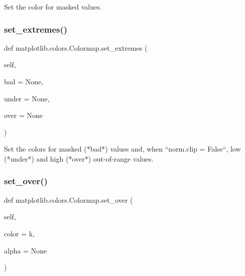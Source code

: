 \begin{DoxyVerb}Set the color for masked values.\end{DoxyVerb}
 \mbox{\label{classmatplotlib_1_1colors_1_1Colormap_a9038b3b8d92f01f8d33e3a053a60f606}} 
\subsubsection{\texorpdfstring{set\+\_\+extremes()}{set\_extremes()}}
{\footnotesize\ttfamily def matplotlib.\+colors.\+Colormap.\+set\+\_\+extremes (\begin{DoxyParamCaption}\item[{}]{self,  }\item[{}]{bad = {\ttfamily None},  }\item[{}]{under = {\ttfamily None},  }\item[{}]{over = {\ttfamily None} }\end{DoxyParamCaption})}

\begin{DoxyVerb}Set the colors for masked (*bad*) values and, when ``norm.clip =
False``, low (*under*) and high (*over*) out-of-range values.
\end{DoxyVerb}
 \mbox{\label{classmatplotlib_1_1colors_1_1Colormap_aa232a6b3a533fa42f35b32bcf533ea2b}} 
\subsubsection{\texorpdfstring{set\+\_\+over()}{set\_over()}}
{\footnotesize\ttfamily def matplotlib.\+colors.\+Colormap.\+set\+\_\+over (\begin{DoxyParamCaption}\item[{}]{self,  }\item[{}]{color = {\ttfamily \textquotesingle{}k\textquotesingle{}},  }\item[{}]{alpha = {\ttfamily None} }\end{DoxyParamCaption})}

